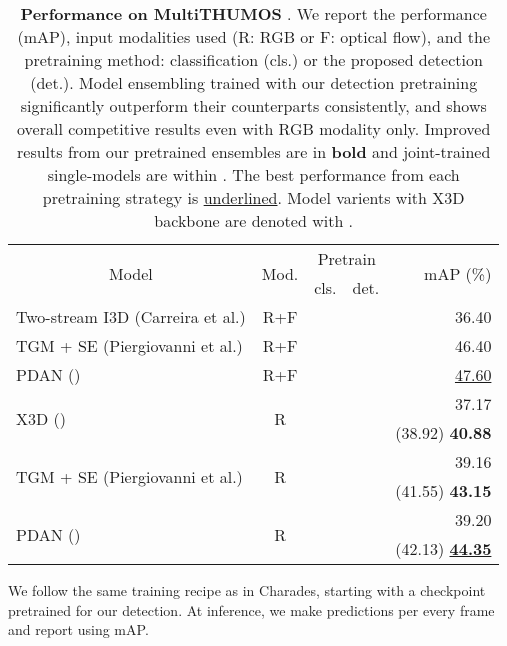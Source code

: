 \documentclass[letterpaper]{article} \usepackage{aaai23}  \usepackage{times}  \usepackage{helvet}  \usepackage{courier}  \usepackage[hyphens]{url}  \usepackage{graphicx} \urlstyle{rm} \def\UrlFont{\rm}  \usepackage{natbib}  \usepackage{caption} \frenchspacing  \setlength{\pdfpagewidth}{8.5in}  \setlength{\pdfpageheight}{11in}  \usepackage{algorithm}
\newcommand{\ch}{}
\newcommand{\tablestyle}[2]{\setlength{\tabcolsep}{#1}\renewcommand{\arraystretch}{#2}\centering\footnotesize}
\begin{document}
\begin{table}[t!]
	\centering
	\tablestyle{1.8pt}{1.}
	\fontsize{9}{11}\selectfont
		\begin{tabular}{l|c|c|c|r}
			\multicolumn{1}{c|}{\multirow{2}{*}{Model}}  & \multicolumn{1}{c|}{\multirow{2}{*}{Mod.}} & \multicolumn{2}{c|}{Pretrain}  & \multirow{2}{*}{mAP (\%)} \\
			{} & {} & cls. & det. & {} \\
			\shline
			{Two-stream I3D (Carreira et al.)} & R+F & \checkmark & {} & 36.40 \\
			{TGM + SE (Piergiovanni et al.)} & R+F & \checkmark & {} & 46.40 \\
			{PDAN (\citeauthor{dai2021pdan})} & R+F & \checkmark & {} & \underline{47.60} \\
			
			\hline
			\multirow{2}{*}{{X3D (\citeauthor{feichtenhofer2020x3d})}} & \multirow{2}{*}{R} & \checkmark & {} &   37.17 \\
			{} & {} & {} & \checkmark & {(38.92) \textbf{40.88}} \\
			\hline
			\multirow{2}{*}{{TGM + SE (Piergiovanni et al.)}} & \multirow{2}{*}{R} & \checkmark & {} & {39.16}  \\
			{} & {} & {} & \checkmark & {(41.55) \textbf{43.15}} \\
			\hline
			\multirow{2}{*}{{PDAN (\citeauthor{dai2021pdan})}} & \multirow{2}{*}{R} & \checkmark & {} & {39.20}  \\
			{} & {} & {} & \checkmark & {(42.13) \textbf{\underline{44.35}}} \\
			

	\end{tabular}
	\caption{\textbf{Performance on MultiTHUMOS} \cite{yeung2018every}. We report the performance (mAP), input modalities used (R: RGB or F: optical flow), and the pretraining method: classification (cls.) or the proposed detection (det.). Model ensembling trained with our detection pretraining significantly outperform their counterparts consistently, and shows overall competitive results even with RGB modality only. Improved results from our pretrained ensembles are in \textbf{bold} and \ch{joint-trained single-models are within .} The best performance from each pretraining strategy is \underline{underlined}. Model varients with X3D backbone are denoted with .}
	\label{tab:thumos}
\end{table}




We follow the same training recipe as in Charades, starting with a checkpoint pretrained for our detection. At inference, we make predictions per every frame and report using mAP.
\end{document}
